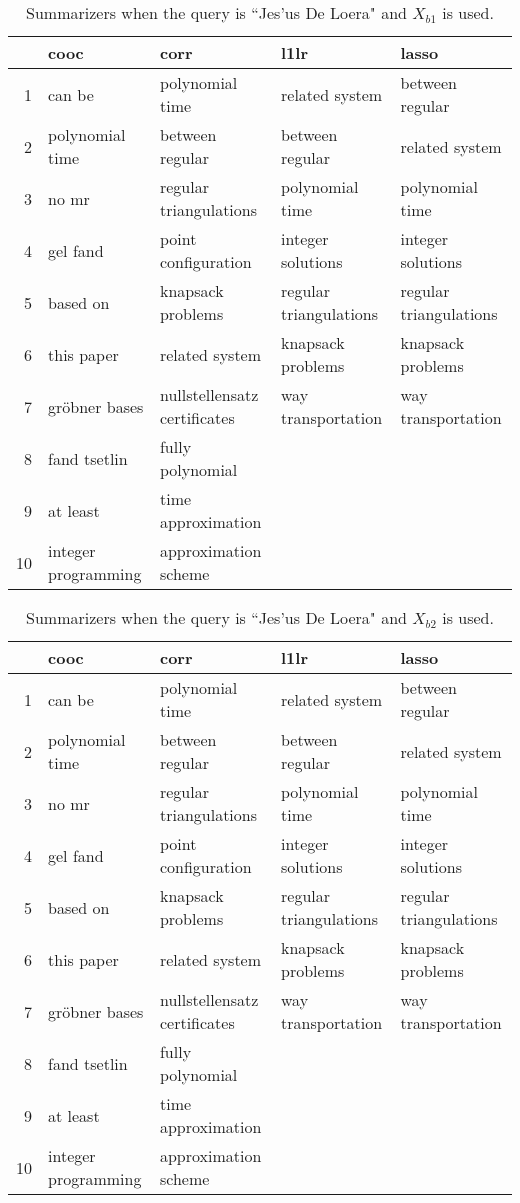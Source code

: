 \documentclass{article}
\begin{document}
\begin{table}[H]
\begin{center}
\begin{tabular}{|r|llll|}
\hline
& cooc & corr & l1lr & lasso \\
\hline
1 & can be & polynomial time & related system & between regular \\
2 & polynomial time & between regular & between regular & related system \\
3 & no mr & regular triangulations & polynomial time & polynomial time \\
4 & gel fand & point configuration & integer solutions & integer solutions \\
5 & based on & knapsack problems & regular triangulations & regular triangulations \\
6 & this paper & related system & knapsack problems & knapsack problems \\
7 & gröbner bases & nullstellensatz certificates & way transportation & way transportation \\
8 & fand tsetlin & fully polynomial & & \\
9 & at least & time approximation & & \\
10 & integer programming & approximation scheme & & \\
\hline
\end{tabular}
\end{center}
\caption{Summarizers when the query is ``Jes\a'us De Loera" and $X_{b1}$ is used.}
\end{table}

\begin{table}[H]
\begin{center}
\begin{tabular}{|r|llll|}
 \hline
& cooc & corr & l1lr & lasso \\
 \hline
1 & can be & polynomial time & related system & between regular \\
 2 & polynomial time & between regular & between regular & related system \\
 3 & no mr & regular triangulations & polynomial time & polynomial time \\
 4 & gel fand & point configuration & integer solutions & integer solutions \\
 5 & based on & knapsack problems & regular triangulations & regular triangulations \\
 6 & this paper & related system & knapsack problems & knapsack problems \\
 7 & gröbner bases & nullstellensatz certificates & way transportation & way transportation \\
 8 & fand tsetlin & fully polynomial & & \\
 9 & at least & time approximation & & \\
 10 & integer programming & approximation scheme & & \\
 \hline
\end{tabular}
\end{center}
\caption{Summarizers when the query is ``Jes\a'us De Loera" and $X_{b2}$ is used.}
\end{table}
\end{document}
